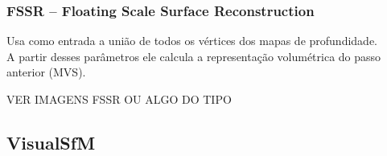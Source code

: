 \documentclass[table, usenames, svgnames, xcolor=dvipsnames]{beamer}
\begin{document}
\begin{frame}
\frametitle{\textbf{FSSR -- Floating Scale Surface Reconstruction}}
	\begin{center}
	Usa como entrada a união de todos os vértices dos mapas de profundidade. \\
	A partir desses parâmetros ele calcula a representação volumétrica do passo anterior (MVS).
	\end{center}
\end{frame}

\begin{frame}
VER IMAGENS FSSR OU ALGO DO TIPO
\end{frame}
%

\subsection{VisualSfM}
\end{document}
